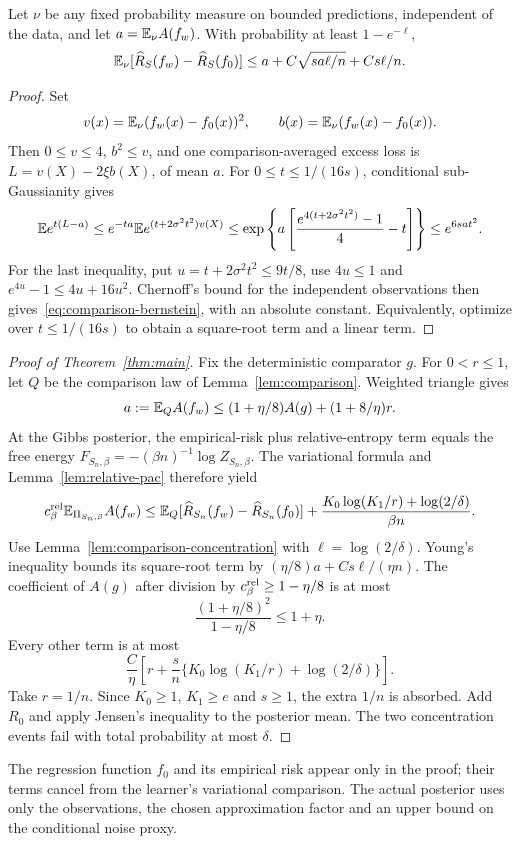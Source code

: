 \begin{lemma}\label{lem:comparison-concentration}
Let $\nu$ be any fixed probability measure on bounded predictions, independent of the data, and let $a=\mathbb E_\nu A(f_w)$. With probability at least $1-e^{-\ell}$,
\begin{equation}
 \mathbb E_\nu[\widehat R_S(f_w)-\widehat R_S(f_0)]
 \le a+C\sqrt{sa\ell/n}+Cs\ell/n.
 \label{eq:comparison-bernstein}
\end{equation}
\end{lemma}
\begin{proof}
Set
\[
 v(x)=\mathbb E_\nu(f_w(x)-f_0(x))^2,\qquad
 b(x)=\mathbb E_\nu(f_w(x)-f_0(x)).
\]
Then $0\le v\le4$, $b^2\le v$, and one comparison-averaged excess loss is $L=v(X)-2\xi b(X)$, of mean $a$. For $0\le t\le1/(16s)$, conditional sub-Gaussianity gives
\[
 \mathbb E e^{t(L-a)}
 \le e^{-ta}\mathbb E e^{(t+2\sigma^2t^2)v(X)}
 \le\exp\left\{a\left[\frac{e^{4(t+2\sigma^2t^2)}-1}{4}-t\right]\right\}
 \le e^{6sa t^2}.
\]
For the last inequality, put $u=t+2\sigma^2t^2\le9t/8$, use $4u\le1$ and $e^{4u}-1\le4u+16u^2$. Chernoff's bound for the independent observations then gives~\eqref{eq:comparison-bernstein}, with an absolute constant. Equivalently, optimize over $t\le1/(16s)$ to obtain a square-root term and a linear term.
\end{proof}

\begin{proof}[Proof of Theorem~\ref{thm:main}]
Fix the deterministic comparator $g$. For $0<r\le1$, let $Q$ be the comparison law of Lemma~\ref{lem:comparison}. Weighted triangle gives
\[
 a:=\mathbb E_Q A(f_w)
 \le(1+\eta/8)A(g)+(1+8/\eta)r.
\]
At the Gibbs posterior, the empirical-risk plus relative-entropy term equals the free energy
$F_{S_n,\beta}=-(\beta n)^{-1}\log Z_{S_n,\beta}$.
The variational formula and Lemma~\ref{lem:relative-pac} therefore yield
\[
 c_\beta^{\rm rel}\mathbb E_{\Pi_{S_n,\beta}}A(f_w)
 \le \mathbb E_Q[\widehat R_{S_n}(f_w)-\widehat R_{S_n}(f_0)]
       +\frac{K_0\log(K_1/r)+\log(2/\delta)}{\beta n}.
\]
Use Lemma~\ref{lem:comparison-concentration} with $\ell=\log(2/\delta)$.
Young's inequality bounds its square-root term by
$(\eta/8)a+Cs\ell/(\eta n)$.
The coefficient of $A(g)$ after division by
$c_\beta^{\rm rel}\ge1-\eta/8$ is at most
\[
 \frac{(1+\eta/8)^2}{1-\eta/8}\le1+\eta.
\]
Every other term is at most
\[
 \frac C\eta\left[
 r+\frac{s}{n}\{K_0\log(K_1/r)+\log(2/\delta)\}\right].
\]
Take $r=1/n$. Since $K_0\ge1$, $K_1\ge e$ and $s\ge1$, the extra $1/n$ is absorbed. Add $R_0$ and apply Jensen's inequality to the posterior mean. The two concentration events fail with total probability at most $\delta$.
\end{proof}

The regression function $f_0$ and its empirical risk appear only in the proof; their terms cancel from the learner's variational comparison. The actual posterior uses only the observations, the chosen approximation factor and an upper bound on the conditional noise proxy.
